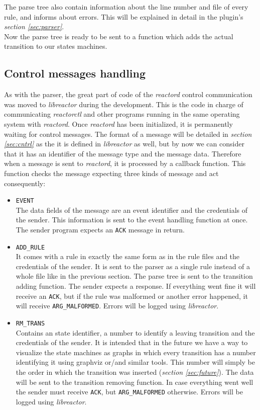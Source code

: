 The parse tree also contain information about the line number and file of every rule, and informs about errors. This will be explained in
detail in the plugin's \emph{section \ref{sec:parser}}.\\ 
Now the parse tree is ready to be sent to a function which adds the actual transition to our states machines.
\subsection{Control messages handling}
As with the parser, the great part of code of the \emph{reactord} control communication was moved to \emph{libreactor} during the 
development.
This is the code in charge of communicating \emph{reactorctl} and other programs running in the same operating system with \emph{reactord}.
Once \emph{reactord} has been initialized, it is permanently waiting for control messages. The format of a message will be detailed
in \emph{section \ref{sec:cntrl}} as the it is defined in \emph{libreactor} as well, but by now we can consider that it has an 
identifier of the message type and the message data. Therefore when a message is sent to \emph{reactord}, it is processed by a callback 
function. This function checks the message expecting three kinds of message and act consequently:
\begin{itemize}
  \item \texttt{EVENT}\\
    The data fields of the message are an event identifier and the credentials of the sender. This information is sent to the event handling
    function at once. The sender program expects an \texttt{ACK} message in return.
  \item \texttt{ADD\_RULE}\\
    It comes with a rule in exactly the same form as in the rule files and the credentials of the sender. It is sent to the parser as a 
    single rule instead of a whole file like in the previous section. The parse tree is sent to the transition adding function. The sender 
    expects a response. If everything went fine it will receive an \texttt{ACK}, but if the rule was malformed or another error happened, 
    it will receive \texttt{ARG\_MALFORMED}. Errors will be logged using \emph{libreactor}.
  \item \texttt{RM\_TRANS}\\
    Contains an state identifier, a number to identify a leaving transition and the credentials of the sender. It is intended that in
    the future we have a way to visualize the state machines as graphs in which every transition has a number identifying it using 
    graphviz\cite{graphviz} or/and similar tools. This number will simply be the order in which the transition was inserted 
    (\emph{section \ref{sec:future}}). The data will be sent to the transition removing function. In case everything went well the sender 
    must receive \texttt{ACK}, but \texttt{ARG\_MALFORMED} otherwise. Errors will be logged using \emph{libreactor}.
\end{itemize}
